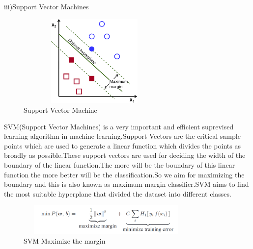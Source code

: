 \documentclass[conference,compsoc]{IEEEtran}
\begin{document}
iii)Support Vector Machines
\begin{figure}[H]
\centering
\includegraphics[width=3in,height=1.8in]{svm1.png}
\caption{Support Vector Machine}
\label{fig_error}

\end{figure}  
\newline
\par
SVM(Support Vector Machines) is a very important and efficient suprevised learning algorithm in machine learning.Support Vectors are the critical sample points which are used to generate a linear function which divides the points as broadly as possible.These support vectors are used for deciding the width of the boundary of the linear function.The more will be the boundary of this linear function the more better will be the classification.So we aim for maximizing the boundary and this is also known as maximum margin classifier.SVM aims to find the most suitable hyperplane that divided the dataset into different classes.
\newline
\begin{figure}[H]
\centering
\includegraphics[width=3.5in,height=0.6in]{svm2.png}
\caption{SVM Maximize the margin}
\label{fig_error}

\end{figure}  
\end{document}
